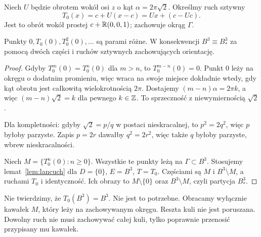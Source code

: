 Niech $U$ będzie obrotem wokół osi $z$ o kąt $\alpha=2\pi\sqrt2$. Określmy ruch sztywny
\begin{equation}\label{eq:8-1}
 T_0(x)=c+U(x-c)=Ux+(c-Uc).
\end{equation}
Jest to obrót wokół prostej $c+\mathbb R(0,0,1)$; zachowuje okrąg $\Gamma$.
\begin{lemat}\label{lem:wchloniecie-srodka}
Punkty $0,T_0(0),T_0^2(0),\ldots$ są parami różne. W konsekwencji $B^3\equiv B^3_*$ za pomocą dwóch części i ruchów sztywnych zachowujących orientację.
\end{lemat}
\begin{proof}
Gdyby $T_0^m(0)=T_0^n(0)$ dla $m>n$, to $T_0^{m-n}(0)=0$. Punkt $0$ leży na okręgu o dodatnim promieniu, więc wraca na swoje miejsce dokładnie wtedy, gdy kąt obrotu jest całkowitą wielokrotnością $2\pi$. Dostajemy $(m-n)\alpha=2\pi k$, a więc $(m-n)\sqrt2=k$ dla pewnego $k\in\mathbb Z$. To sprzeczność z niewymiernością $\sqrt2$.

Dla kompletności: gdyby $\sqrt2=p/q$ w postaci nieskracalnej, to $p^2=2q^2$, więc $p$ byłoby parzyste. Zapis $p=2r$ dawałby $q^2=2r^2$, więc także $q$ byłoby parzyste, wbrew nieskracalności.

Niech $M=\{T_0^n(0):n\ge0\}$. Wszystkie te punkty leżą na $\Gamma\subset B^3$. Stosujemy lemat~\ref{lem:lancuch} dla $D=\{0\}$, $E=B^3$, $T=T_0$. Częściami są $M$ i $B^3\setminus M$, a ruchami $T_0$ i identyczność. Ich obrazy to $M\setminus\{0\}$ oraz $B^3\setminus M$, czyli partycja $B^3_*$.
\end{proof}
\begin{uwaga}
Nie twierdzimy, że $T_0(B^3)=B^3$. Nie jest to potrzebne. Obracamy wyłącznie kawałek $M$, który leży na zachowywanym okręgu. Reszta kuli nie jest poruszana. Dowolny ruch nie musi zachowywać całej kuli, tylko poprawnie przenosić przypisany mu kawałek.
\end{uwaga}

